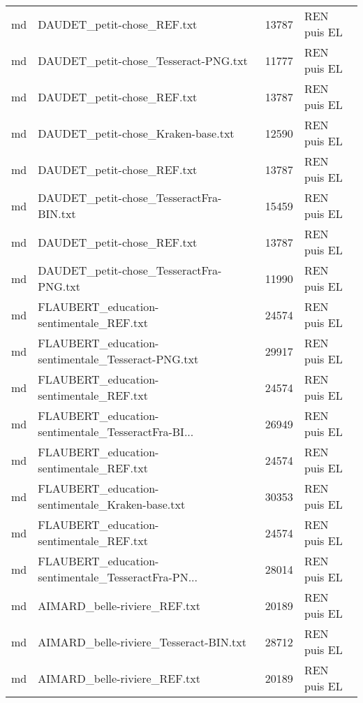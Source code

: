 \begin{tabular}{llrl}
    md &                         DAUDET\_petit-chose\_REF.txt &                 13787 & REN puis EL \\
    md &               DAUDET\_petit-chose\_Tesseract-PNG.txt &                 11777 & REN puis EL \\
    md &                         DAUDET\_petit-chose\_REF.txt &                 13787 & REN puis EL \\
    md &                 DAUDET\_petit-chose\_Kraken-base.txt &                 12590 & REN puis EL \\
    md &                         DAUDET\_petit-chose\_REF.txt &                 13787 & REN puis EL \\
    md &            DAUDET\_petit-chose\_TesseractFra-BIN.txt &                 15459 & REN puis EL \\
    md &                         DAUDET\_petit-chose\_REF.txt &                 13787 & REN puis EL \\
    md &            DAUDET\_petit-chose\_TesseractFra-PNG.txt &                 11990 & REN puis EL \\
    md &            FLAUBERT\_education-sentimentale\_REF.txt &                 24574 & REN puis EL \\
    md &  FLAUBERT\_education-sentimentale\_Tesseract-PNG.txt &                 29917 & REN puis EL \\
    md &            FLAUBERT\_education-sentimentale\_REF.txt &                 24574 & REN puis EL \\
    md & FLAUBERT\_education-sentimentale\_TesseractFra-BI... &                 26949 & REN puis EL \\
    md &            FLAUBERT\_education-sentimentale\_REF.txt &                 24574 & REN puis EL \\
    md &    FLAUBERT\_education-sentimentale\_Kraken-base.txt &                 30353 & REN puis EL \\
    md &            FLAUBERT\_education-sentimentale\_REF.txt &                 24574 & REN puis EL \\
    md & FLAUBERT\_education-sentimentale\_TesseractFra-PN... &                 28014 & REN puis EL \\
    md &                       AIMARD\_belle-riviere\_REF.txt &                 20189 & REN puis EL \\
    md &             AIMARD\_belle-riviere\_Tesseract-BIN.txt &                 28712 & REN puis EL \\
    md &                       AIMARD\_belle-riviere\_REF.txt &                 20189 & REN puis EL \\

\end{tabular}
